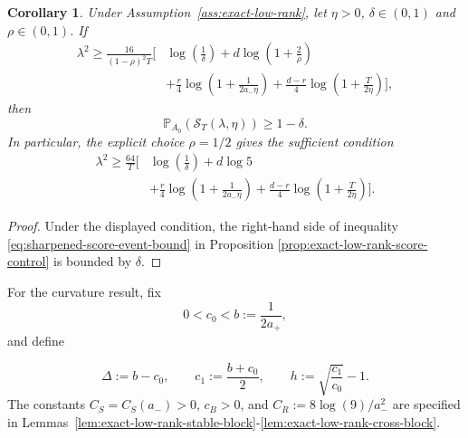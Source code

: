 \documentclass[11pt]{article}
\newtheorem{corollary}[theorem]{Corollary}
\newtheorem{remark}[theorem]{Remark}
\begin{document}
\begin{corollary}%
\label{cor:exact-low-rank-score-tuning}
Under Assumption~\ref{ass:exact-low-rank}, let $\eta>0$, $\delta\in(0,1)$ and
$\rho\in(0,1)$. If
\begin{equation}
\begin{aligned}
    \lambda^2
    \geq
    \frac{16}{(1-\rho)^2T}
    \Bigg[
        &\log\!\left(\frac1\delta\right)
        +d\log\!\left(1+\frac2\rho\right) \\
        &+\frac r4\log\!\left(1+\frac{1}{2a_-\eta}\right)
        +\frac{d-r}{4}\log\!\left(1+\frac{T}{2\eta}\right)
    \Bigg],
\end{aligned}
\label{eq:exact-low-rank-tuning-general-rho}
\end{equation}
then
\[
    \mathbb P_{A_0}\!\left(
        \mathcal S_T(\lambda,\eta)
    \right)
    \geq1-\delta.
\]
In particular, the explicit choice $\rho=1/2$ gives the sufficient condition
\begin{equation}
\begin{aligned}
    \lambda^2
    \geq
    \frac{64}{T}
    \Bigg[
        &\log\!\left(\frac1\delta\right)
        +d\log 5 \\
        &+\frac r4\log\!\left(1+\frac{1}{2a_-\eta}\right)
        +\frac{d-r}{4}\log\!\left(1+\frac{T}{2\eta}\right)
    \Bigg].
\end{aligned}
\label{eq:exact-low-rank-tuning-rho-half}
\end{equation}
\end{corollary}

\begin{proof}
Under the displayed condition, the right-hand side of inequality \eqref{eq:sharpened-score-event-bound} in 
Proposition \ref{prop:exact-low-rank-score-control} is bounded by $\delta$.
\end{proof}


For the curvature result, fix
\[
0<c_0<b:=\frac{1}{2a_+},
\]
and define

\begin{equation}
    \Delta:=b-c_0,
    \qquad
    c_1:=\frac{b+c_0}{2},
    \qquad
    h:=\sqrt{\frac{c_1}{c_0}}-1.
\label{eq:curvature-constants}
\end{equation}
The constants $C_S=C_S(a_-)>0$, $c_B>0$, and
$C_R:=8\log(9)/a_-^2$ are specified in
Lemmas~\ref{lem:exact-low-rank-stable-block}-\ref{lem:exact-low-rank-cross-block}.
\end{document}
